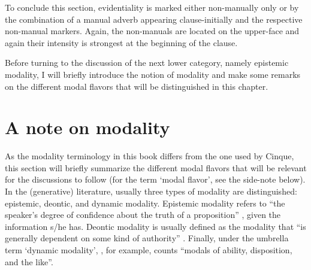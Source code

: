 To conclude this section, evidentiality is marked either non-manually only or by the combination of a manual adverb appearing clause-initially and the respective non-manual markers. Again, the non-manuals are located on the upper-face and again their intensity is strongest at the beginning of the clause.

Before turning to the discussion of the next lower category, namely epistemic modality, I will briefly introduce the notion of modality and make some remarks on the different modal flavors that will be distinguished in this chapter.

\section{A note on modality}\label{anoteonmodality}%
As the modality terminology in this book differs from the one used by Cinque, this section will briefly summarize the different modal flavors that will be relevant for the discussions to follow (for the term `modal flavor', see the side-note below). In the (generative) literature, usually three types of modality are distinguished: epistemic, deontic, and dynamic modality. Epistemic modality refers to ``the speaker's degree of confidence about the truth of a proposition'' \citep[86]{cinque1999adverbs}, given the information s/he has. Deontic modality is usually defined as the modality that ``is generally dependent on some kind of authority'' \citep[70]{palmer2001mood}. Finally, under the umbrella term `dynamic modality', \citet[196]{portner2009modality}, for example, counts ``modals of ability, disposition, and the like''. 

